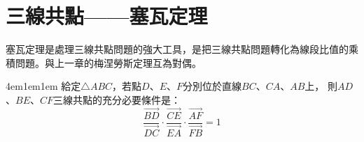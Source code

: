 \documentclass[12pt]{article}
\newif\ifshow
\begin{document}
\section{三線共點——塞瓦定理}
塞瓦定理是處理三線共點問題的強大工具，是把三線共點問題轉化為線段比值的乘積問題。與上一章的梅涅勞斯定理互為對偶。
\begin{mybox}[定理]{4em}{1em}{1em}
    給定$\triangle{ABC}$，若點$D$、$E$、$F$分別位於直線$BC$、$CA$、$AB$上，
    則$AD$、$BE$、$CF$三線共點的充分必要條件是：
    \begin{equation*}
        \frac{\overrightarrow{BD}}{\overrightarrow{DC}}
        \cdot\frac{\overrightarrow{CE}}{\overrightarrow{EA}}
        \cdot\frac{\overrightarrow{AF}}{\overrightarrow{FB}} = 1
    \end{equation*}
\end{mybox}
\ifshow
\end{document}
